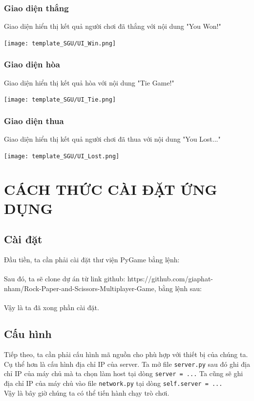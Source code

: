 \documentclass[a4paper]{article}
\begin{document}
\subsubsection{Giao diện thắng}
Giao diện hiển thị kết quả người chơi đã thắng với nội dung "You Won!"
\begin{center}
    \texttt{[image: template\_SGU/UI\_Win.png]}
\end{center}
\subsubsection{Giao diện hòa}
Giao diện hiển thị kết quả hòa với nội dung "Tie Game!"
\begin{center}
    \texttt{[image: template\_SGU/UI\_Tie.png]}
\end{center}
\subsubsection{Giao diện thua}
Giao diện hiển thị kết quả người chơi đã thua với nội dung "You Lost..."
\begin{center}
    \texttt{[image: template\_SGU/UI\_Lost.png]}
\end{center}
\newpage
\section{CÁCH THỨC CÀI ĐẶT ỨNG DỤNG}
\subsection{Cài đặt}
Đầu tiền, ta cần phải cài đặt thư viện PyGame bằng lệnh:\\
\\
Sau đó, ta sẽ clone dự án từ link github: https://github.com/giaphat-nham/Rock-Paper-and-Scissors-Multiplayer-Game, bằng lệnh sau:\\
\\
Vậy là ta đã xong phần cài đặt.
\subsection{Cấu hình}
Tiếp theo, ta cần phải cấu hình mã nguồn cho phù hợp với thiết bị của chúng ta. Cụ thể hơn là cấu hình địa chỉ IP của server. Ta mở file {\tt server.py} sau đó ghi địa chỉ IP của máy chủ mà ta chọn làm host tại dòng {\tt server = ...} Ta cũng sẽ ghi địa chỉ IP của máy chủ vào file {\tt network.py} tại dòng {\tt self.server = ...}\\
Vậy là bây giờ chúng ta có thể tiến hành chạy trò chơi.
\end{document}
